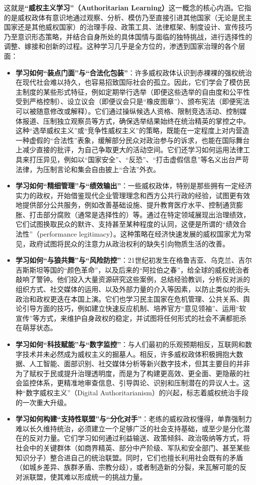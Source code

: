 \documentclass[UTF8, 10pt]{ctexbook}
\begin{document}
这就是\textbf{“威权主义学习”（Authoritarian Learning）}这一概念的核心内涵。它指的是威权政体有意识地通过观察、分析、模仿乃至直接引进其他国家（无论是民主国家还是其他威权国家）的治理手段、政策工具、法律框架、制度设计、宣传技巧乃至意识形态策略，并结合自身所处的具体国情与面临的独特挑战，进行选择性的调整、嫁接和创新的过程。这种学习几乎是全方位的，渗透到国家治理的各个层面：
\begin{itemize}
    \item \textbf{学习如何“装点门面”与“合法化包装”}：许多威权政体认识到赤裸裸的强权统治在现代社会难以持久，也容易招致国际社会的孤立。因此，它们学会了模仿民主制度的某些形式特征，例如定期举行选举（即便这些选举的自由度和公平性受到严格控制）、设立议会（即便议会只是“橡皮图章”）、颁布宪法（即便宪法可以被随意修改或解释）。它们通过操纵候选人资格、限制竞选活动、控制媒体报道、压制独立观察员等方式，确保选举结果始终在统治精英的掌控之中。这种“选举威权主义”或“竞争性威权主义”的策略，既能在一定程度上对内营造一种虚假的“合法性”表象，缓解部分民众对政治参与的诉求，也能在国际舞台上减少直接的批评，为自己争取更大的活动空间。它们还学习如何运用法律工具来打压异见，例如以“国家安全”、“反恐”、“打击虚假信息”等名义出台严苛法律，为压制言论和集会自由披上“合法”外衣。
    \item \textbf{学习如何“精细管理”与“绩效输出”}：一些威权政体，特别是那些拥有一定经济实力的政权，开始借鉴现代企业管理理念和西方公共行政的经验，试图更有效地提供部分公共服务，例如改善基础设施、提升教育医疗水平、控制通货膨胀、打击部分腐败（通常是选择性的）等。通过在特定领域展现出治理绩效，它们试图换取民众的默许、支持甚至某种程度的认同，这便是所谓的“绩效合法性”（performance legitimacy）。这种策略在经济快速发展的威权国家尤为常见，政府试图将民众的注意力从政治权利的缺失引向物质生活的改善。
    \item \textbf{学习如何“与狼共舞”与“风险防控”}：21世纪初发生在格鲁吉亚、乌克兰、吉尔吉斯斯坦等国的“颜色革命”，以及后来的“阿拉伯之春”，给全球的威权统治者敲响了警钟。他们投入大量资源研究这些案例，总结经验教训，分析反对派的组织方式、社交媒体的运用、以及外部力量的介入等因素，以防止类似的街头政治和政权更迭在本国上演。它们也学习民主国家在危机管理、公共关系、舆论引导方面的技巧，例如建立快速反应机制、培养官方“意见领袖”、运用“软宣传”等方式，来维护自身政权的稳定，并试图将任何形式的社会不满都扼杀在萌芽状态。
    \item \textbf{学习如何“科技赋能”与“数字监控”}：与人们最初的乐观预期相反，互联网和数字技术并未必然成为威权主义的掘墓人。相反，许多威权政体积极拥抱大数据、人工智能、面部识别、社交媒体分析等新兴数字技术，但其主要目的并非为了赋权于民或提升治理透明度，而是为了构建更高效、更全面、更隐蔽的社会监控体系，更精准地审查信息、引导舆论、识别和压制潜在的异议人士。这种“数字威权主义”（Digital Authoritarianism）的兴起，标志着威权统治手段的一次重大升级。
    \item \textbf{学习如何构建“支持性联盟”与“分化对手”}：老练的威权政权懂得，单靠强制力难以长久维持统治，必须建立一个足够广泛的社会支持基础，或至少是分化潜在的反对力量。它们学习如何通过利益输送、政策倾斜、政治吸纳等方式，将社会中的关键群体（如商界精英、部分中产阶级、军队和安全部门、甚至某些知识分子）整合进自己的统治联盟。同时，它们也擅长利用社会既有的矛盾（如城乡差异、族群矛盾、宗教分歧），或者制造新的分裂，来瓦解可能的反对派联盟，使其难以形成统一的挑战力量。
\end{itemize}
\end{document}
